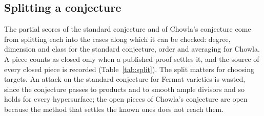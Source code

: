 \subsection{Splitting a conjecture}\label{ssec:split}

The partial scores of the standard conjecture and of Chowla's conjecture come from splitting each into the cases along which it can be checked: degree, dimension and class for the standard conjecture, order and averaging for Chowla. A piece counts as closed only when a published proof settles it, and the source of every closed piece is recorded (Table~\ref{tab:split}). The split matters for choosing targets. An attack on the standard conjecture for Fermat varieties is wasted, since the conjecture passes to products and to smooth ample divisors \cite{Kle94} and so holds for every hypersurface; the open pieces of Chowla's conjecture are open because the method that settles the known ones does not reach them.

